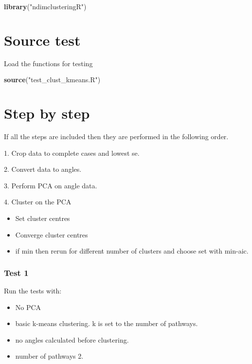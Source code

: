 \documentclass[
]{article}
\newenvironment{Shaded}{\begin{snugshade}}{\end{snugshade}}
\newcommand{\FunctionTok}[1]{\textcolor[rgb]{0.13,0.29,0.53}{\textbf{#1}}}
\newcommand{\NormalTok}[1]{#1}
\newcommand{\StringTok}[1]{\textcolor[rgb]{0.31,0.60,0.02}{#1}}
\providecommand{\tightlist}{%
  \setlength{\itemsep}{0pt}\setlength{\parskip}{0pt}}
\begin{document}
\begin{Shaded}
\begin{Highlighting}[]
\FunctionTok{library}\NormalTok{(}\StringTok{"ndimclusteringR"}\NormalTok{)}
\end{Highlighting}
\end{Shaded}

\hypertarget{source-test}{%
\section{Source test}\label{source-test}}

Load the functions for testing

\begin{Shaded}
\begin{Highlighting}[]
\FunctionTok{source}\NormalTok{(}\StringTok{"test\_clust\_kmeans.R"}\NormalTok{)}
\end{Highlighting}
\end{Shaded}

\hypertarget{step-by-step}{%
\section{Step by step}\label{step-by-step}}

If all the steps are included then they are performed in the following
order.

1. Crop data to complete cases and lowest se.

2. Convert data to angles.

3. Perform PCA on angle data.

4. Cluster on the PCA

\begin{itemize}
\tightlist
\item
  Set cluster centres
\item
  Converge cluster centres
\item
  if min then rerun for different number of clusters and choose set with
  min-aic.
\end{itemize}

\hypertarget{test-1}{%
\subsubsection{Test 1}\label{test-1}}

Run the tests with:

\begin{itemize}
\tightlist
\item
  No PCA
\item
  basic k-means clustering. k is set to the number of pathways.
\item
  no angles calculated before clustering.
\item
  number of pathways 2.
\end{itemize}
\end{document}
